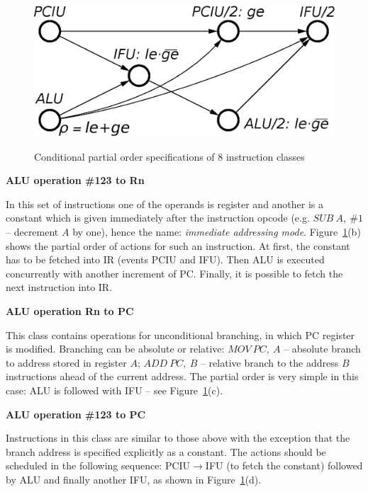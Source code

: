 \begin{figure}
\begin{centering}
{\includegraphics[scale=0.36]{fig/po_CALU_123_PC}}
\par\end{centering}

\caption{Conditional partial order specifications of 8 instruction classes\label{app-fig-Scenarios-of-8}}
\end{figure}


\textbf{ALU operation \#123 to Rn}

In this set of instructions one of the operands is register and another
is a constant which is given immediately after the instruction opcode
(e.g. $\mathit{SUB\ A,\ \#1}$ -- decrement $A$ by one), hence the
name: \emph{immediate addressing mode}. Figure~\ref{app-fig-Scenarios-of-8}(b)
shows the partial order of actions for such an instruction. At first,
the constant has to be fetched into IR (events PCIU and IFU). Then
ALU is executed concurrently with another increment of PC. Finally,
it is possible to fetch the next instruction into IR.

\textbf{ALU operation Rn to PC}

This class contains operations for unconditional branching, in which
PC register is modified. Branching can be absolute or relative: $\mathit{MOV\ PC,\ A}$
-- absolute branch to address stored in register $A$; $\mathit{ADD\ PC,\ B}$
-- relative branch to the address $B$ instructions ahead of the current
address. The partial order is very simple in this case: ALU is followed
with IFU -- see Figure~\ref{app-fig-Scenarios-of-8}(c).

\textbf{ALU operation \#123 to PC}

Instructions in this class are similar to those above with the exception
that the branch address is specified explicitly as a constant. The
actions should be scheduled in the following sequence: PCIU$\rightarrow$IFU
(to fetch the constant) followed by ALU and finally another IFU, as
shown in Figure~\ref{app-fig-Scenarios-of-8}(d).

